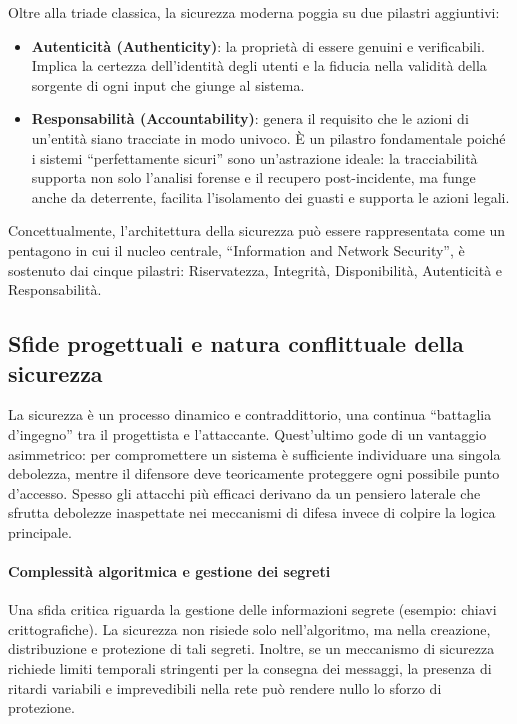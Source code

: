 Oltre alla triade classica, la sicurezza moderna poggia su due pilastri
aggiuntivi:

\begin{itemize}
\item \textbf{Autenticità (Authenticity)}: la proprietà di essere genuini e
verificabili. Implica la certezza dell'identità degli utenti e la fiducia nella
validità della sorgente di ogni input che giunge al sistema.
\item \textbf{Responsabilità (Accountability)}: genera il requisito che le
azioni di un'entità siano tracciate in modo univoco. È un pilastro fondamentale
poiché i sistemi ``perfettamente sicuri'' sono un'astrazione ideale: la
tracciabilità supporta non solo l'analisi forense e il recupero post-incidente,
ma funge anche da deterrente, facilita l'isolamento dei guasti e supporta
le azioni legali.
\end{itemize}

Concettualmente, l'architettura della sicurezza può essere rappresentata come
un pentagono in cui il nucleo centrale, ``Information and Network Security'', è
sostenuto dai cinque pilastri: Riservatezza, Integrità, Disponibilità, Autenticità
e Responsabilità.

\subsection{Sfide progettuali e natura conflittuale della sicurezza}

La sicurezza è un processo dinamico e contraddittorio, una continua ``battaglia
d'ingegno'' tra il progettista e l'attaccante. Quest'ultimo gode di un vantaggio
asimmetrico: per compromettere un sistema è sufficiente individuare una singola
debolezza, mentre il difensore deve teoricamente proteggere ogni possibile punto
d'accesso. Spesso gli attacchi più efficaci derivano da un pensiero laterale che
sfrutta debolezze inaspettate nei meccanismi di difesa invece di colpire la
logica principale.

\paragraph{Complessità algoritmica e gestione dei segreti}

Una sfida critica riguarda la gestione delle informazioni segrete (esempio: chiavi
crittografiche). La sicurezza non risiede solo nell'algoritmo, ma nella creazione,
distribuzione e protezione di tali segreti. Inoltre, se un meccanismo di sicurezza
richiede limiti temporali stringenti per la consegna dei messaggi, la presenza di
ritardi variabili e imprevedibili nella rete può rendere nullo lo sforzo di
protezione.

